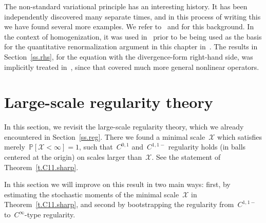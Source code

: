 \documentclass[11pt]{article} %
\numberwithin{equation}{section}
\theoremstyle{definition}
\renewcommand{\P}{\mathbb{P}}
\newcommand{\X}{\mathcal{X}}
\begin{document}
The non-standard variational principle has an interesting history. It has been independently discovered many separate times, and in this process of writing this we have found several more examples. We refer to~\cite{AM} and\cite[Chapter 10]{AKMBook} for this background. In the context of homogenization, it was used in~\cite{FP1,GMS,ADMZ} prior to be being used as the basis for the quantitative renormalization argument in this chapter in~\cite{AM}. The results in Section~\ref{ss.rhs}, for the equation with the divergence-form right-hand side, was implicitly treated in~\cite{AM}, since that covered much more general nonlinear operators. 















\section{Large-scale regularity theory}
\label{s.regularity} 


In this section, we revisit the large-scale regularity theory, which we already encountered in Section~\ref{ss.reg}. There we found a minimal scale~$\X$ which satisfies merely~$\P[\X<\infty] = 1$, such that~$C^{0,1}$ and~$C^{1,1-}$ regularity holds (in balls centered at the origin) on scales larger than~$\X$. See the statement of Theorem~\ref{t.C11.sharp}. 

\smallskip

In this section we will improve on this result in two main ways: first, by estimating the stochastic moments of the minimal scale~$\X$ in Theorem~\ref{t.C11.sharp}, and second by bootstrapping the regularity from~$C^{1,1-}$ to~$C^\infty$-type regularity. 
\end{document}
